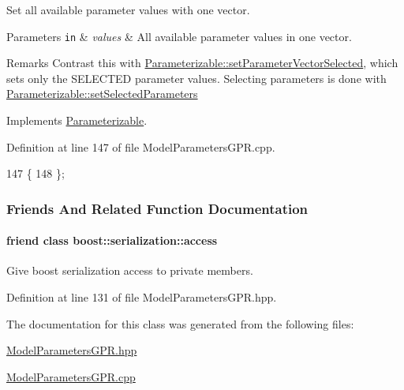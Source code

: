 Set all available parameter values with one vector. 


\begin{DoxyParams}[1]{Parameters}
\mbox{\tt in}  & {\em values} & All available parameter values in one vector. \\
\hline
\end{DoxyParams}
\begin{DoxyRemark}{Remarks}
Contrast this with \hyperlink{classDmpBbo_1_1Parameterizable_aee501e63a46d63eb58a6f271bf093b9d}{Parameterizable\+::set\+Parameter\+Vector\+Selected}, which sets only the S\+E\+L\+E\+C\+T\+E\+D parameter values. Selecting parameters is done with \hyperlink{classDmpBbo_1_1Parameterizable_a8a976b5db2d1809ece10e431816f0f27}{Parameterizable\+::set\+Selected\+Parameters} 
\end{DoxyRemark}


Implements \hyperlink{classDmpBbo_1_1Parameterizable_acef2ee975b497baf60b1f38da2b65f0d}{Parameterizable}.



Definition at line 147 of file Model\+Parameters\+G\+P\+R.\+cpp.


\begin{DoxyCode}
147                                                                      \{
148 \};
\end{DoxyCode}


\subsubsection{Friends And Related Function Documentation}
\hypertarget{classDmpBbo_1_1ModelParametersGPR_ac98d07dd8f7b70e16ccb9a01abf56b9c}{
\paragraph[{boost\+::serialization\+::access}]{\setlength{\rightskip}{0pt plus 5cm}friend class boost\+::serialization\+::access\hspace{0.3cm}{\ttfamily [friend]}}}\label{classDmpBbo_1_1ModelParametersGPR_ac98d07dd8f7b70e16ccb9a01abf56b9c}


Give boost serialization access to private members. 



Definition at line 131 of file Model\+Parameters\+G\+P\+R.\+hpp.



The documentation for this class was generated from the following files\+:\begin{DoxyCompactItemize}
\item 
\hyperlink{ModelParametersGPR_8hpp}{Model\+Parameters\+G\+P\+R.\+hpp}\item 
\hyperlink{ModelParametersGPR_8cpp}{Model\+Parameters\+G\+P\+R.\+cpp}\end{DoxyCompactItemize}
